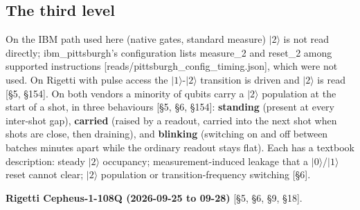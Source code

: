 \documentclass[11pt]{article}
\begin{document}
\subsection{The third level}
On the IBM path used here (native gates, standard measure) \(|2\rangle\) is not read directly; ibm\_pittsburgh's configuration lists measure\_2 and reset\_2 among supported instructions {[}reads/pittsburgh\_config\_timing.json{]}, which were not used. On Rigetti with pulse access the \(|1\rangle\)-\(|2\rangle\) transition is driven and \(|2\rangle\) is read {[}\S{}5, \S{}154{]}. On both vendors a minority of qubits carry a \(|2\rangle\) population at the start of a shot, in three behaviours {[}\S{}5, \S{}6, \S{}154{]}: \textbf{standing} (present at every inter-shot gap), \textbf{carried} (raised by a readout, carried into the next shot when shots are close, then draining), and \textbf{blinking} (switching on and off between batches minutes apart while the ordinary readout stays flat). Each has a textbook description: steady \(|2\rangle\) occupancy; measurement-induced leakage that a \(|0\rangle\)/\(|1\rangle\) reset cannot clear; \(|2\rangle\) population or transition-frequency switching {[}\S{}6{]}.

\textbf{Rigetti Cepheus-1-108Q (2026-09-25 to 09-28)} {[}\S{}5, \S{}6, \S{}9, \S{}18{]}.
\end{document}
